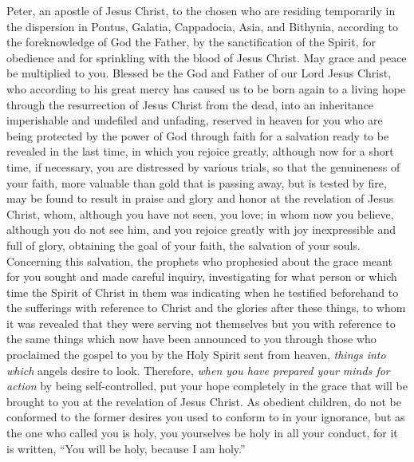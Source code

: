 
\begin{biblechapter} %
 Peter, an apostle of Jesus Christ, to the chosen who are residing temporarily in the dispersion in Pontus, Galatia, Cappadocia, Asia, and Bithynia,
\verse according to the foreknowledge of God the Father, by the sanctification of the Spirit, for obedience and for sprinkling with the blood of Jesus Christ. May grace and peace be multiplied to you.
 Blessed be the God and Father of our Lord Jesus Christ, who according to his great mercy has caused us to be born again to a living hope through the resurrection of Jesus Christ from the dead,
\verse into an inheritance imperishable and undefiled and unfading, reserved in heaven for you
\verse who are being protected by the power of God through faith for a salvation ready to be revealed in the last time,
\verse in which you rejoice greatly, although now for a short time, if necessary, you are distressed by various trials,
\verse so that the genuineness of your faith, more valuable than gold that is passing away, but is tested by fire, may be found to result in praise and glory and honor at the revelation of Jesus Christ,
\verse whom, although you have not seen, you love; in whom now you believe, although you do not see him, and you rejoice greatly with joy inexpressible and full of glory,
\verse obtaining the goal of your faith, the salvation of your souls.
\verse Concerning this salvation, the prophets who prophesied about the grace meant for you sought and made careful inquiry,
\verse investigating for what person or which time the Spirit of Christ in them was indicating when he testified beforehand to the sufferings with reference to Christ and the glories after these things,
\verse to whom it was revealed that they were serving not themselves but you with reference to the same things which now have been announced to you through those who proclaimed the gospel to you by the Holy Spirit sent from heaven, \textit{things into which} angels desire to look.
 Therefore, \textit{when you have prepared your minds for action} by being self-controlled, put your hope completely in the grace that will be brought to you at the revelation of Jesus Christ.
\verse As obedient children, do not be conformed to the former desires you used to conform to in your ignorance,
\verse but as the one who called you is holy, you yourselves be holy in all your conduct,
\verse for it is written, “You will be holy, because I am holy.”

\end{biblechapter}
